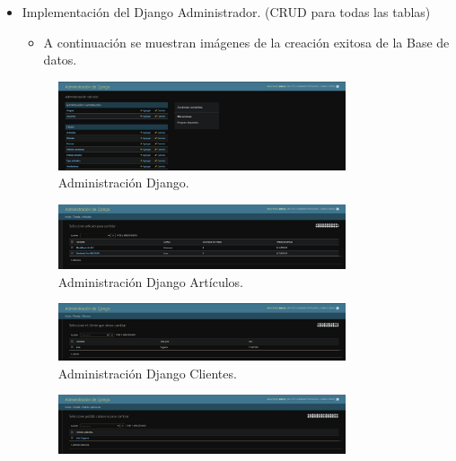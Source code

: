 \documentclass{article}
\begin{document}
\begin{itemize}
\begin{itemize}
            \item Implementación del Django Administrador. (CRUD para todas las tablas)
            \begin{itemize}
                \item A continuación se muestran imágenes de la creación exitosa de la Base de datos.
            \end{itemize}
            \begin{figure}[H]
		      \centering
                \includegraphics[width=0.8\textwidth,keepaspectratio]{img/V11.jpeg}
		      \caption{Administración Django.}
	   \end{figure}
            \begin{figure}[H]
		      \centering
                \includegraphics[width=0.8\textwidth,keepaspectratio]{img/V12.jpeg}
		      \caption{Administración Django Artículos.}
	   \end{figure}
            \begin{figure}[H]
		      \centering
                \includegraphics[width=0.8\textwidth,keepaspectratio]{img/V13.jpeg}
		      \caption{Administración Django Clientes.}
	   \end{figure}
            \begin{figure}[H]
		      \centering
                \includegraphics[width=0.8\textwidth,keepaspectratio]{img/V14.jpeg}

\end{figure}
\end{itemize}
\end{itemize}
\end{document}

